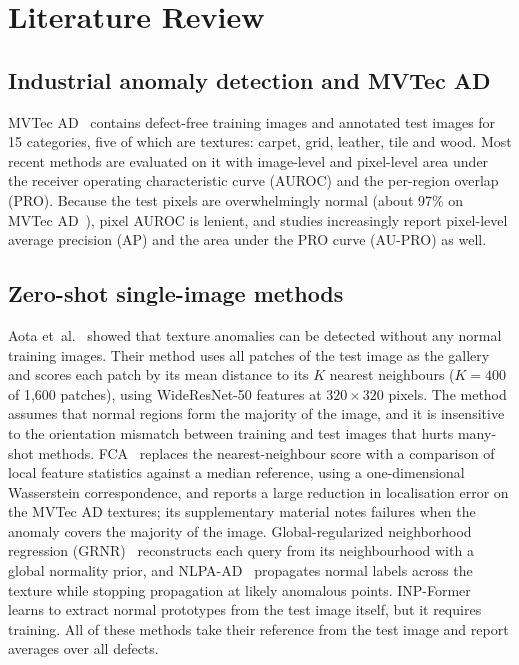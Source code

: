\section{Literature Review}
\label{sec:related}

\subsection{Industrial anomaly detection and MVTec AD}
MVTec AD~\cite{bergmann2021mvtec} contains defect-free training images and
annotated test images for 15 categories, five of which are textures:
carpet, grid, leather, tile and wood. Most recent methods are evaluated on
it with image-level and pixel-level area under the receiver operating
characteristic curve (AUROC) and the per-region overlap (PRO). Because the
test pixels are overwhelmingly normal (about 97\% on MVTec
AD~\cite{li2024musc}), pixel AUROC is lenient, and studies increasingly
report pixel-level average precision (AP) and the area under the PRO curve
(AU-PRO) as well.

\subsection{Zero-shot single-image methods}
Aota et~al.~\cite{aota2023zeroshot} showed that texture anomalies can be
detected without any normal training images. Their method uses all patches
of the test image as the gallery and scores each patch by its mean distance
to its $K$ nearest neighbours ($K=400$ of 1{,}600 patches), using
WideResNet-50 features at $320\times320$ pixels. The method assumes that
normal regions form the majority of the image, and it is insensitive to the
orientation mismatch between training and test images that hurts many-shot
methods. FCA~\cite{ardelean2024highfidelity} replaces the nearest-neighbour
score with a comparison of local feature statistics against a median
reference, using a one-dimensional Wasserstein correspondence, and reports a
large reduction in localisation error on the MVTec AD textures; its
supplementary material notes failures when the anomaly covers the majority
of the image. Global-regularized neighborhood regression
(GRNR)~\cite{yao2025grnr} reconstructs each query from its neighbourhood with
a global normality prior, and NLPA-AD~\cite{zhang2025nlpa} propagates normal
labels across the texture while stopping propagation at likely anomalous
points. INP-Former~\cite{luo2025inp} learns to extract normal prototypes from
the test image itself, but it requires training. All of these methods take
their reference from the test image and report averages over all defects.

